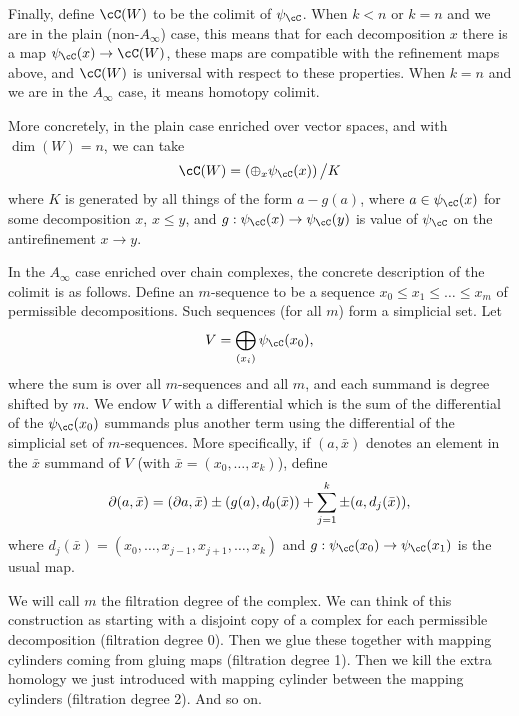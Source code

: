 Finally, define $\cC(W)$ to be the colimit of $\psi_\cC$.
When $k<n$ or $k=n$ and we are in the plain (non-$A_\infty$) case, this means that
for each decomposition $x$ there is a map
$\psi_\cC(x)\to \cC(W)$, these maps are compatible with the refinement maps
above, and $\cC(W)$ is universal with respect to these properties.
When $k=n$ and we are in the $A_\infty$ case, it means
homotopy colimit.

More concretely, in the plain case enriched over vector spaces, and with $\dim(W) = n$, we can take
\[
	\cC(W) = \left( \oplus_x \psi_\cC(x)\right) \big/ K
\]
where $K$ is generated by all things of the form $a - g(a)$, where
$a\in \psi_\cC(x)$ for some decomposition $x$, $x\le y$, and $g: \psi_\cC(x)
\to \psi_\cC(y)$ is value of $\psi_\cC$ on the antirefinement $x\to y$.

In the $A_\infty$ case enriched over chain complexes, the concrete description of the colimit
is as follows.
Define an $m$-sequence to be a sequence $x_0 \le x_1 \le \dots \le x_m$ of permissible decompositions.
Such sequences (for all $m$) form a simplicial set.
Let
\[
	V = \bigoplus_{(x_i)} \psi_\cC(x_0) ,
\]
where the sum is over all $m$-sequences and all $m$, and each summand is degree shifted by $m$.
We endow $V$ with a differential which is the sum of the differential of the $\psi_\cC(x_0)$
summands plus another term using the differential of the simplicial set of $m$-sequences.
More specifically, if $(a, \bar{x})$ denotes an element in the $\bar{x}$
summand of $V$ (with $\bar{x} = (x_0,\dots,x_k)$), define
\[
	\partial (a, \bar{x}) = (\partial a, \bar{x}) \pm (g(a), d_0(\bar{x})) + \sum_{j=1}^k \pm (a, d_j(\bar{x})) ,
\]
where $d_j(\bar{x}) = (x_0,\dots,x_{j-1},x_{j+1},\dots,x_k)$ and $g: \psi_\cC(x_0)\to \psi_\cC(x_1)$
is the usual map.

We will call $m$ the filtration degree of the complex.
We can think of this construction as starting with a disjoint copy of a complex for each
permissible decomposition (filtration degree 0).
Then we glue these together with mapping cylinders coming from gluing maps
(filtration degree 1).
Then we kill the extra homology we just introduced with mapping cylinder between the mapping cylinders (filtration degree 2).
And so on.

